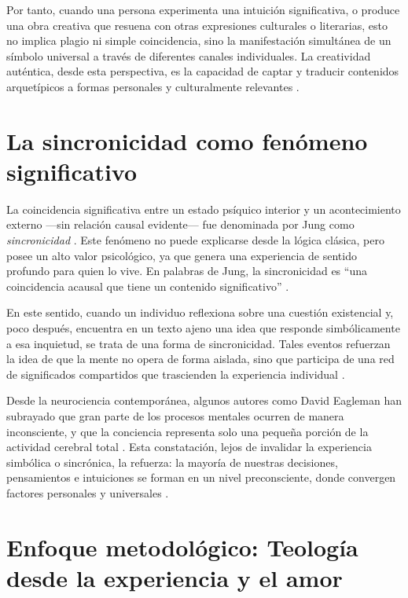 \documentclass[a4paper,12pt]{article}
\begin{document}
Por tanto, cuando una persona experimenta una intuición significativa, o produce una obra creativa que resuena con otras expresiones culturales o literarias, esto no implica plagio ni simple coincidencia, sino la manifestación simultánea de un símbolo universal a través de diferentes canales individuales. La creatividad auténtica, desde esta perspectiva, es la capacidad de captar y traducir contenidos arquetípicos a formas personales y culturalmente relevantes \cite{jung1959}.

\section*{La sincronicidad como fenómeno significativo}

La coincidencia significativa entre un estado psíquico interior y un acontecimiento externo —sin relación causal evidente— fue denominada por Jung como \textit{sincronicidad} \cite{jung1959,jungpauli1952}. Este fenómeno no puede explicarse desde la lógica clásica, pero posee un alto valor psicológico, ya que genera una experiencia de sentido profundo para quien lo vive. En palabras de Jung, la sincronicidad es ``una coincidencia acausal que tiene un contenido significativo'' \cite{jung1959}.

En este sentido, cuando un individuo reflexiona sobre una cuestión existencial y, poco después, encuentra en un texto ajeno una idea que responde simbólicamente a esa inquietud, se trata de una forma de sincronicidad. Tales eventos refuerzan la idea de que la mente no opera de forma aislada, sino que participa de una red de significados compartidos que trascienden la experiencia individual \cite{jung1959}.

Desde la neurociencia contemporánea, algunos autores como David Eagleman han subrayado que gran parte de los procesos mentales ocurren de manera inconsciente, y que la conciencia representa solo una pequeña porción de la actividad cerebral total \cite{eagleman2011}. Esta constatación, lejos de invalidar la experiencia simbólica o sincrónica, la refuerza: la mayoría de nuestras decisiones, pensamientos e intuiciones se forman en un nivel preconsciente, donde convergen factores personales y universales \cite{jung1959}.



\section*{Enfoque metodológico: Teología desde la experiencia y el amor}
\end{document}
